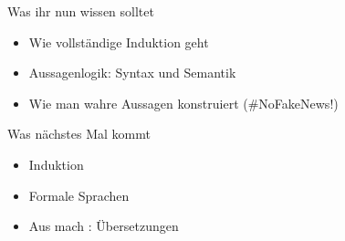 \begin{frame}
	\begin{block}{Was ihr nun wissen solltet}
		\begin{itemize}
			\item Wie vollständige Induktion geht
			\item Aussagenlogik: Syntax und Semantik
			\item Wie man wahre Aussagen konstruiert \qquad (\#NoFakeNews!)
		\end{itemize}
	\end{block}

	\begin{block}{Was nächstes Mal kommt}
		\begin{itemize}
			\item Induktion
			\item Formale Sprachen
			\item Aus  mach : Übersetzungen
		\end{itemize}
	\end{block}
\end{frame}





\backupend


